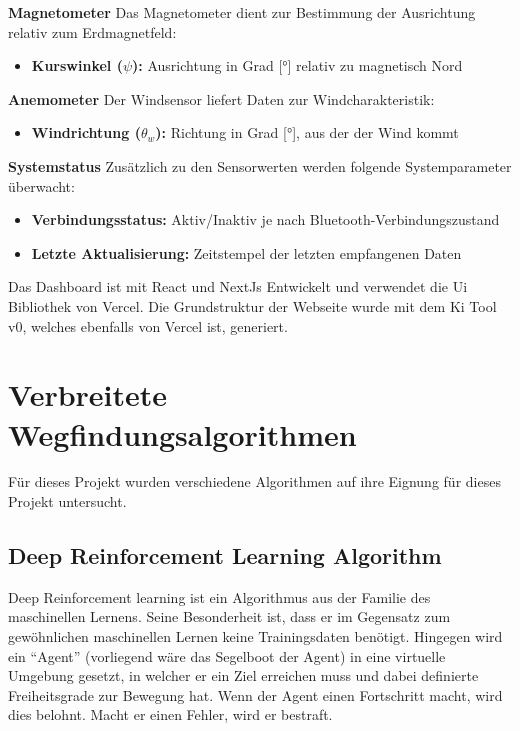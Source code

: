 \textbf{Magnetometer}
Das Magnetometer dient zur Bestimmung der Ausrichtung relativ zum Erdmagnetfeld:
\begin{itemize}
    \item \textbf{Kurswinkel ($\psi$):} Ausrichtung in Grad [°] relativ zu magnetisch Nord
\end{itemize}

\textbf{Anemometer}
Der Windsensor liefert Daten zur Windcharakteristik:
\begin{itemize}
    \item \textbf{Windrichtung ($\theta_w$):} Richtung in Grad [°], aus der der Wind kommt
\end{itemize}

\textbf{Systemstatus}
Zusätzlich zu den Sensorwerten werden folgende Systemparameter überwacht:
\begin{itemize}
    \item \textbf{Verbindungsstatus:} Aktiv/Inaktiv je nach Bluetooth-Verbindungszustand
    \item \textbf{Letzte Aktualisierung:} Zeitstempel der letzten empfangenen Daten
\end{itemize}


Das Dashboard ist mit React und NextJs Entwickelt und verwendet die Ui Bibliothek von Vercel. Die Grundstruktur der Webseite wurde mit dem Ki Tool v0, welches ebenfalls von Vercel ist, generiert.





\section{Verbreitete Wegfindungsalgorithmen}
Für dieses Projekt wurden verschiedene Algorithmen auf ihre Eignung für dieses Projekt untersucht.

\subsection{Deep Reinforcement Learning Algorithm }
Deep Reinforcement learning ist ein Algorithmus aus der Familie des maschinellen Lernens. Seine Besonderheit ist, dass er im Gegensatz zum gewöhnlichen maschinellen Lernen keine Trainingsdaten benötigt. Hingegen wird ein \enquote{Agent} (vorliegend wäre das Segelboot der Agent) in eine virtuelle Umgebung gesetzt, in welcher er ein Ziel erreichen muss und dabei definierte Freiheitsgrade zur Bewegung hat. Wenn der Agent einen Fortschritt macht, wird dies belohnt. Macht er einen Fehler, wird er bestraft.

